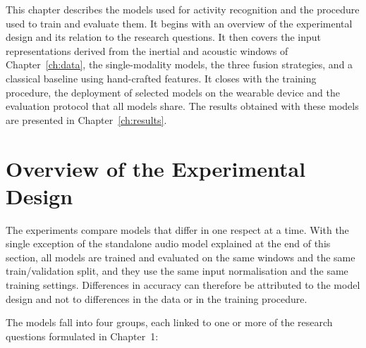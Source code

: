 
\label{ch:method}


This chapter describes the models used for activity recognition and the
procedure used to train and evaluate them. It begins with an overview of the
experimental design and its relation to the research questions. It then covers
the input representations derived from the inertial and acoustic windows of
Chapter~\ref{ch:data}, the single-modality models, the three fusion strategies,
and a classical baseline using hand-crafted features. It closes with the training
procedure, the deployment of selected models on the wearable device and the
evaluation protocol that all models share. The results obtained with these models
are presented in Chapter~\ref{ch:results}.

\section{Overview of the Experimental Design}
\label{sec:design}

The experiments compare models that differ in one respect at a time. With the
single exception of the standalone audio model explained at the end of this
section, all models are trained and evaluated on the same windows and the same
train/validation split, and they use the same input normalisation and the same training settings.
Differences in accuracy can therefore be attributed to the model design and not
to differences in the data or in the training procedure.

The models fall into four groups, each linked to one or more of the research
questions formulated in Chapter~1:

